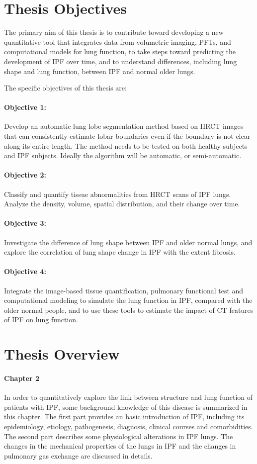 \section{Thesis Objectives} \label{ThesisObjective}
The primary aim of this thesis is to contribute toward developing a new quantitative tool that integrates data from volumetric imaging, PFTs, and computational models for lung function, to take steps toward predicting the development of IPF over time, and to understand differences, including lung shape and lung function, between IPF and normal older lungs. 

The specific objectives of this thesis are:

\paragraph{Objective 1:} Develop an automatic lung lobe segmentation method based on HRCT images that can consistently estimate lobar boundaries even if the boundary is not clear along its entire length. The method needs to be tested on both healthy subjects and IPF subjects. Ideally the algorithm will be automatic, or semi-automatic.
\paragraph{Objective 2:} Classify and quantify tissue abnormalities from HRCT scans of IPF lungs. Analyze the density, volume, spatial distribution, and their change over time.
\paragraph{Objective 3:} Investigate the difference of lung shape between IPF and older normal lungs, and explore the correlation of lung shape change in IPF with the extent fibrosis.
\paragraph{Objective 4:} Integrate the image-based tissue quantification, pulmonary functional test and computational modeling to simulate the lung function in IPF, compared with the older normal people, and to use these tools to estimate the impact of CT features of IPF on lung function.

\section{Thesis Overview}
\paragraph{Chapter 2} In order to quantitatively explore the link between structure and lung function of patients with IPF, some background knowledge of this disease is summarized in this chapter. The first part provides an basic introduction of IPF, including its epidemiology, etiology, pathogenesis, diagnosis, clinical courses and comorbidities. The second part describes some physiological alterations in IPF lungs. The changes in the mechanical properties of the lungs in IPF and the changes in pulmonary gas exchange are discussed in details.
